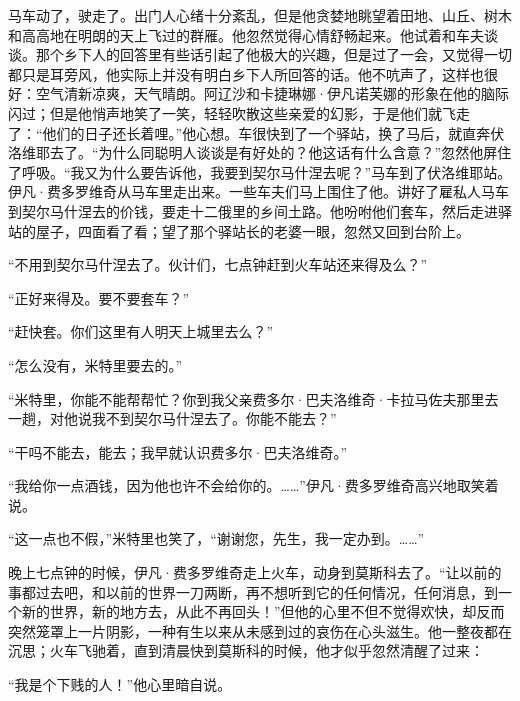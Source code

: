 \par 马车动了，驶走了。出门人心绪十分紊乱，但是他贪婪地眺望着田地、山丘、树木和高高地在明朗的天上飞过的群雁。他忽然觉得心情舒畅起来。他试着和车夫谈谈。那个乡下人的回答里有些话引起了他极大的兴趣，但是过了一会，又觉得一切都只是耳旁风，他实际上并没有明白乡下人所回答的话。他不吭声了，这样也很好：空气清新凉爽，天气晴朗。阿辽沙和卡捷琳娜·伊凡诺芙娜的形象在他的脑际闪过；但是他悄声地笑了一笑，轻轻吹散这些亲爱的幻影，于是他们就飞走了：“他们的日子还长着哩。”他心想。车很快到了一个驿站，换了马后，就直奔伏洛维耶去了。“为什么同聪明人谈谈是有好处的？他这话有什么含意？”忽然他屏住了呼吸。“我又为什么要告诉他，我要到契尔马什涅去呢？”马车到了伏洛维耶站。伊凡·费多罗维奇从马车里走出来。一些车夫们马上围住了他。讲好了雇私人马车到契尔马什涅去的价钱，要走十二俄里的乡间土路。他吩咐他们套车，然后走进驿站的屋子，四面看了看；望了那个驿站长的老婆一眼，忽然又回到台阶上。
\par “不用到契尔马什涅去了。伙计们，七点钟赶到火车站还来得及么？”
\par “正好来得及。要不要套车？”
\par “赶快套。你们这里有人明天上城里去么？”
\par “怎么没有，米特里要去的。”
\par “米特里，你能不能帮帮忙？你到我父亲费多尔·巴夫洛维奇·卡拉马佐夫那里去一趟，对他说我不到契尔马什涅去了。你能不能去？”
\par “干吗不能去，能去；我早就认识费多尔·巴夫洛维奇。”
\par “我给你一点酒钱，因为他也许不会给你的。……”伊凡·费多罗维奇高兴地取笑着说。
\par “这一点也不假，”米特里也笑了，“谢谢您，先生，我一定办到。……”
\par 晚上七点钟的时候，伊凡·费多罗维奇走上火车，动身到莫斯科去了。“让以前的事都过去吧，和以前的世界一刀两断，再不想听到它的任何情况，任何消息，到一个新的世界，新的地方去，从此不再回头！”但他的心里不但不觉得欢快，却反而突然笼罩上一片阴影，一种有生以来从未感到过的哀伤在心头滋生。他一整夜都在沉思；火车飞驰着，直到清晨快到莫斯科的时候，他才似乎忽然清醒了过来：
\par “我是个下贱的人！”他心里暗自说。
